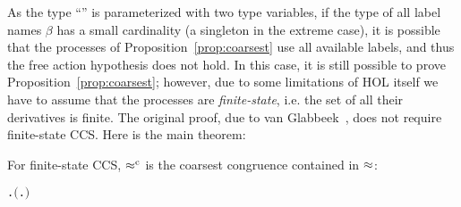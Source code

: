 As the type ``'' is parameterized with two
type variables, if the type of all label
names $\beta$ has a  small cardinality (a singleton in the
extreme case), it is possible that the processes of
Proposition~\ref{prop:coarsest} use all available labels, and thus the free
action hypothesis does not hold. In this case, it is still possible to prove
Proposition~\ref{prop:coarsest}; however, due to some
limitations of HOL itself we have to assume that the
processes are \emph{finite-state}, i.e. the set of all their derivatives is
finite. The original proof, due to van
Glabbeek~\cite{van2005characterisation}, does not require finite-state CCS.
Here is the main theorem:
\begin{theorem}
    \label{thm:coarsestfiniteState}
    For finite-state CCS, $\mathrel{\approx^{\rm{c}}}$ is the coarsest congruence contained in $\approx$:
\begin{alltt}
\HOLTokenTurnstile{} \HOLSymConst{\HOLTokenForall{}} .   \HOLSymConst{\HOLTokenConj{}}   \HOLSymConst{\HOLTokenImp{}} \ensuremath{(} \HOLSymConst{\HOLTokenObsCongr}  \HOLSymConst{\HOLTokenEquiv{}} \HOLSymConst{\HOLTokenForall{}}.  \HOLSymConst{\ensuremath{+}}  \HOLSymConst{\HOLTokenWeakEQ}  \HOLSymConst{\ensuremath{+}} \ensuremath{)}
\end{alltt}
\end{theorem}

